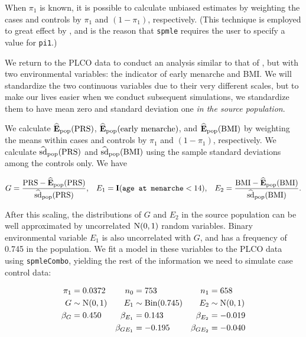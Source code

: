 \documentclass[]{article}
\begin{document}
When \(\pi_1\) is known, it is possible to calculate unbiased estimates
by weighting the cases and controls by \(\pi_1\) and \((1 - \pi_1)\),
respectively. (This technique is employed to great effect by
\citeauthor{Stalder2017}, and is the reason that \texttt{spmle} requires
the user to specify a value for \texttt{pi1}.)

We return to the PLCO data to conduct an analysis similar to that of
\citeauthor{Wang2018unpublished}, but with two environmental variables:
the indicator of early menarche and BMI. We will standardize the two
continuous variables due to their very different scales, but to make our
lives easier when we conduct subsequent simulations, we standardize them
to have mean zero and standard deviation one
\emph{in the source population}.

We calculate \(\mathbf{\widehat{E}_{\rm pop}}(\rm PRS)\),
\(\mathbf{\widehat{E}_{\rm pop}}(\text{early menarche})\), and
\(\mathbf{\widehat{E}_{\rm pop}}(\rm BMI)\) by weighting the means
within cases and controls by \(\pi_1\) and \((1 - \pi_1)\),
respectively. We calculate \(\widehat{\hbox{sd}}_{\rm pop}(\rm PRS)\)
and \(\widehat{\hbox{sd}}_{\rm pop}(\rm BMI)\) using the sample standard
deviations among the controls only. We have

\begin{align*}
  G = \frac{{\rm PRS} - \mathbf{\widehat{E}_{\rm pop}}(\rm PRS)}{\widehat{\hbox{sd}}_{\rm pop}(\rm PRS)}, && E_1 = \mathbf{I}(\texttt{age at menarche} < 14), && E_2 = \frac{{\rm BMI} - \mathbf{\widehat{E}_{\rm pop}}(\rm BMI)}{\widehat{\hbox{sd}}_{\rm pop}(\rm BMI)}.
\end{align*}

After this scaling, the distributions of \(G\) and \(E_2\) in the source
population can be well approximated by uncorrelated \(\hbox{N}(0, 1)\)
random variables. Binary environmental variable \(E_1\) is also
uncorrelated with \(G\), and has a frequency of 0.745 in the population.
We fit a model in these variables to the PLCO data using
\texttt{spmleCombo}, yielding the rest of the information we need to
simulate case control data:

\begin{align*}
  \pi_1   & =    0.0372        & n_0          & =    753               & n_1          & =     658          \\
  G       & \sim \hbox{N}(0,1) & E_1          & \sim \hbox{Bin}(0.745) & E_2          & \sim \hbox{N}(0,1) \\
  \beta_G & =    0.450         & \beta_{E_1}  & =    0.143             & \beta_{E_2}  & =    -0.019        \\
          &                    & \beta_{GE_1} & =   -0.195             & \beta_{GE_2} & =    -0.040
\end{align*}
\end{document}
